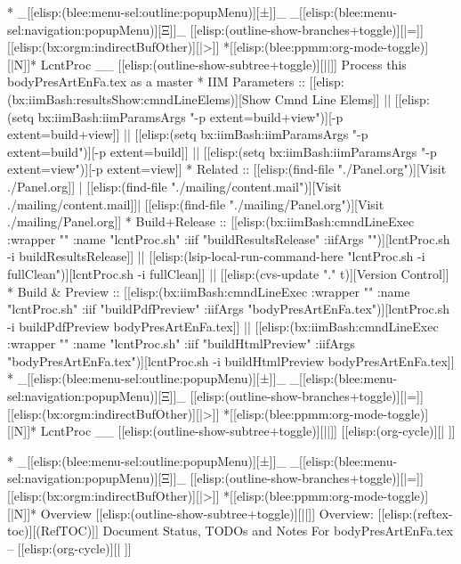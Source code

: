 \begin{whenOrg}
*  _[[elisp:(blee:menu-sel:outline:popupMenu)][±]]_ _[[elisp:(blee:menu-sel:navigation:popupMenu)][Ξ]]_ [[elisp:(outline-show-branches+toggle)][|=]] [[elisp:(bx:orgm:indirectBufOther)][|>]] *[[elisp:(blee:ppmm:org-mode-toggle)][|N]]*  LcntProc _{_ [[elisp:(outline-show-subtree+toggle)][||]] Process this bodyPresArtEnFa.tex as a master
*      IIM Parameters       ::  [[elisp:(bx:iimBash:resultsShow:cmndLineElems)][Show Cmnd Line Elems]] || [[elisp:(setq bx:iimBash:iimParamsArgs "-p extent=build+view")][-p extent=build+view]] || [[elisp:(setq bx:iimBash:iimParamsArgs "-p extent=build")][-p extent=build]] || [[elisp:(setq bx:iimBash:iimParamsArgs "-p extent=view")][-p extent=view]]
*      Related              ::  [[elisp:(find-file "./Panel.org")][Visit ./Panel.org]] | [[elisp:(find-file "./mailing/content.mail")][Visit ./mailing/content.mail]]| [[elisp:(find-file "./mailing/Panel.org")][Visit ./mailing/Panel.org]]
*      Build+Release        ::  [[elisp:(bx:iimBash:cmndLineExec :wrapper "" :name "lcntProc.sh" :iif "buildResultsRelease" :iifArgs "")][lcntProc.sh -i buildResultsRelease]] || [[elisp:(lsip-local-run-command-here "lcntProc.sh -i fullClean")][lcntProc.sh -i fullClean]] || [[elisp:(cvs-update "." t)][Version Control]]
*      Build & Preview      ::  [[elisp:(bx:iimBash:cmndLineExec :wrapper "" :name "lcntProc.sh" :iif "buildPdfPreview" :iifArgs "bodyPresArtEnFa.tex")][lcntProc.sh -i buildPdfPreview bodyPresArtEnFa.tex]] || [[elisp:(bx:iimBash:cmndLineExec :wrapper "" :name "lcntProc.sh" :iif "buildHtmlPreview" :iifArgs "bodyPresArtEnFa.tex")][lcntProc.sh -i buildHtmlPreview bodyPresArtEnFa.tex]]
*  _[[elisp:(blee:menu-sel:outline:popupMenu)][±]]_ _[[elisp:(blee:menu-sel:navigation:popupMenu)][Ξ]]_ [[elisp:(outline-show-branches+toggle)][|=]] [[elisp:(bx:orgm:indirectBufOther)][|>]] *[[elisp:(blee:ppmm:org-mode-toggle)][|N]]*  LcntProc _}_ [[elisp:(outline-show-subtree+toggle)][||]]  [[elisp:(org-cycle)][| ]]
\end{whenOrg}

\begin{whenOrg}
*  _[[elisp:(blee:menu-sel:outline:popupMenu)][±]]_ _[[elisp:(blee:menu-sel:navigation:popupMenu)][Ξ]]_ [[elisp:(outline-show-branches+toggle)][|=]] [[elisp:(bx:orgm:indirectBufOther)][|>]] *[[elisp:(blee:ppmm:org-mode-toggle)][|N]]*  Overview   [[elisp:(outline-show-subtree+toggle)][||]] Overview:  [[elisp:(reftex-toc)][(RefTOC)]] Document Status, TODOs and Notes For bodyPresArtEnFa.tex --   [[elisp:(org-cycle)][| ]]
\end{whenOrg}

